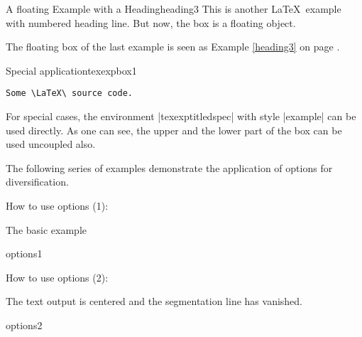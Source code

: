 \begin{dispListing}
\begin{texexptitled}[float]{A floating Example with a Heading}{heading3}
This is another \LaTeX\ example with numbered heading line.
But now, the box is a floating object.
\end{texexptitled}
\end{dispListing}
\tcbusetemp

\begin{dispExample}
The floating box of the last example is seen as Example \ref{heading3}
on page \pageref{heading3}.
\end{dispExample}


\begin{dispExample}
\begin{texexptitledspec}{Special application}{texexpbox1}
\begin{lstlisting}[style=tcblatex]
Some \LaTeX\ source code.
\end{lstlisting}
\tcblower
For special cases, the environment |texexptitledspec| with style
|example| can be used directly. As one can see, the upper and the lower
part of the box can be used uncoupled also.
\end{texexptitledspec}
\end{dispExample}


The following series of examples demonstrate the application of
 options for diversification.

\begin{dispExample}
\begin{texexptitled}{How to use options (1):\par The basic example}{options1}
\end{texexptitled}
\end{dispExample}


\begin{dispExample}
\begin{texexptitled}[center lower,enhanced,segmentation hidden,middle=0mm]
  {How to use options (2):\par The text output is centered and the
    segmentation line has vanished.}{options2}
\end{texexptitled}
\end{dispExample}

